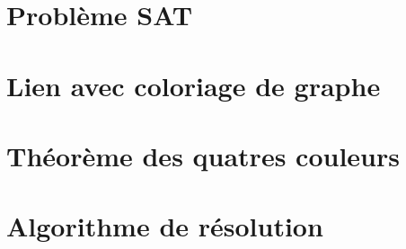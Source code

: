 \documentclass{tipe}
\begin{document}

\clearpage

\part{Problème SAT}


\part{Lien avec coloriage de graphe}


\part{Théorème des quatres couleurs}


\part{Algorithme de résolution}




\end{document}
